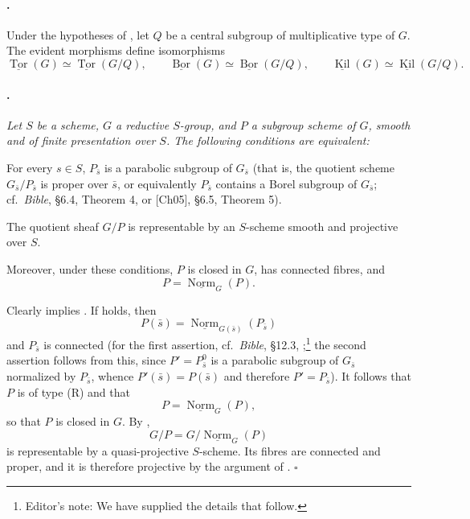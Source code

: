 \paragraph{.}
Under the hypotheses of , let \(Q\) be a central subgroup of
multiplicative type of \(G\). The evident morphisms define
isomorphisms
\[
  \underline{\operatorname{Tor}}(G)
  \simeq
  \underline{\operatorname{Tor}}(G/Q),
  \qquad
  \underline{\operatorname{Bor}}(G)
  \simeq
  \underline{\operatorname{Bor}}(G/Q),
  \qquad
  \underline{\operatorname{Kil}}(G)
  \simeq
  \underline{\operatorname{Kil}}(G/Q).
\]

\paragraph{.}
{\itshape Let \(S\) be a scheme, \(G\) a reductive \(S\)-group, and
\(P\) a subgroup scheme of \(G\), smooth and of finite presentation
over \(S\). The following conditions are equivalent:

\textup{} For every \(s\in S\), \(P_{\bar s}\) is a parabolic
subgroup of \(G_{\bar s}\) \textup{(that is, the quotient scheme
\(G_{\bar s}/P_{\bar s}\) is proper over \(\bar s\), or equivalently
\(P_{\bar s}\) contains a Borel subgroup of \(G_{\bar s}\); cf.\
\emph{Bible}, \S6.4, Theorem 4, or [Ch05], \S6.5, Theorem 5)}.

\textup{} The quotient sheaf \(G/P\) is representable by an
\(S\)-scheme smooth and projective over \(S\).

Moreover, under these conditions, \(P\) is closed in \(G\), has
connected fibres, and
\[
  P=\underline{\operatorname{Norm}}_G(P).
\]}

Clearly \textup{} implies \textup{}. If \textup{} holds,
then
\[
  P(\bar s)
  =
  \underline{\operatorname{Norm}}_{G(\bar s)}(P_{\bar s})
\]
and \(P_{\bar s}\) is connected \textup{(for the first assertion,
cf.\ \emph{Bible}, \S12.3, ;\footnote{Editor's note: We have
supplied the details that follow.} the second assertion}
\textup{follows from this, since
\(P'=P_{\bar s}^{0}\) is a parabolic subgroup of \(G_{\bar s}\)
normalized by \(P_{\bar s}\), whence
\(P'(\bar s)=P(\bar s)\) and therefore \(P'=P_{\bar s}\))}. It
follows that \(P\) is of type \textup{(R)} and that
\[
  P=\underline{\operatorname{Norm}}_G(P),
\]
so that \(P\) is closed in \(G\). By ,
\[
  G/P=G/\underline{\operatorname{Norm}}_G(P)
\]
is representable by a quasi-projective \(S\)-scheme. Its fibres are
connected and proper, and it is therefore projective by the argument
of \SGARefLink{sga3:xxii:cor:5.8.3}{5.8.3}.
\hfill\(\square\)

